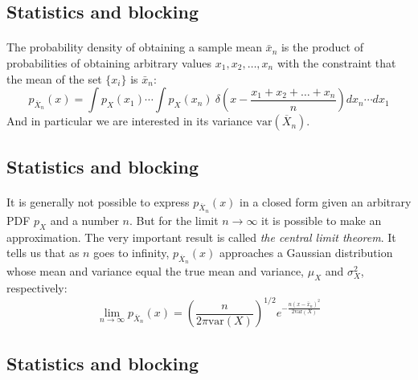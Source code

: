 \documentclass[%
twoside,                 %
final,                   %
10pt]{article}
\begin{document}
\subsection{Statistics and blocking}

\paragraph{}
The probability density of obtaining a sample mean $\bar x_n$
is the product of probabilities of obtaining arbitrary values $x_1,
x_2,\dots,x_n$ with the constraint that the mean of the set $\{x_i\}$
is $\bar x_n$:
\[
p_{\overline X_n}(x) = \int p_X^{\phantom X}(x_1)\cdots
\int p_X^{\phantom X}(x_n)\ 
\delta\!\left(x - \frac{x_1+x_2+\dots+x_n}{n}\right)dx_n \cdots dx_1
\]
And in particular we are interested in its variance $\mathrm{var}(\overline X_n)$.





\subsection{Statistics and blocking}

\paragraph{}
It is generally not possible to express $p_{\overline X_n}(x)$ in a
closed form given an arbitrary PDF $p_X^{\phantom X}$ and a number
$n$. But for the limit $n\to\infty$ it is possible to make an
approximation. The very important result is called \emph{the central limit theorem}. It tells us that as $n$ goes to infinity,
$p_{\overline X_n}(x)$ approaches a Gaussian distribution whose mean
and variance equal the true mean and variance, $\mu_{X}^{\phantom X}$
and $\sigma_{X}^{2}$, respectively:
\begin{equation}
\lim_{n\to\infty} p_{\overline X_n}(x) =
\left(\frac{n}{2\pi\mathrm{var}(X)}\right)^{1/2}
e^{-\frac{n(x-\bar x_n)^2}{2\mathrm{var}(X)}}
\label{eq:central_limit_gaussian}
\end{equation}



\subsection{Statistics and blocking}
\end{document}
